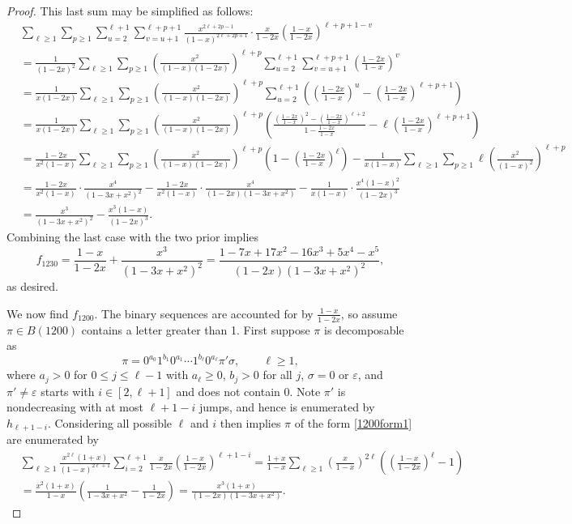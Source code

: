 \documentclass[10pt,a4paper]{amsart}
\begin{document}
\begin{proof}
This last sum may be simplified as follows:
\begin{align*}
&\sum_{\ell \geq1}\sum_{p \geq1}\sum_{u=2}^{\ell+1}\sum_{v=u+1}^{\ell+p+1}\frac{x^{2\ell+2p-1}}{(1-x)^{2\ell+2p+1}}\cdot\frac{x}{1-2x}\left(\frac{1-x}{1-2x}\right)^{\ell+p+1-v}\\
&=\frac{1}{(1-2x)^2}\sum_{\ell \geq1}\sum_{p \geq1}\left(\frac{x^2}{(1-x)(1-2x)}\right)^{\ell+p}\sum_{u=2}^{\ell+1}\sum_{v=u+1}^{\ell+p+1}\left(\frac{1-2x}{1-x}\right)^v\\
&=\frac{1}{x(1-2x)}\sum_{\ell \geq1}\sum_{p \geq1}\left(\frac{x^2}{(1-x)(1-2x)}\right)^{\ell+p}\sum_{u=2}^{\ell+1}\left(\left(\frac{1-2x}{1-x}\right)^u-\left(\frac{1-2x}{1-x}\right)^{\ell+p+1}\right)\qquad\qquad\qquad\qquad\quad\\
&=\frac{1}{x(1-2x)}\sum_{\ell \geq1}\sum_{p \geq1}\left(\frac{x^2}{(1-x)(1-2x)}\right)^{\ell+p}\left(\frac{\left(\frac{1-2x}{1-x}\right)^2-\left(\frac{1-2x}{1-x}\right)^{\ell+2}}{1-\frac{1-2x}{1-x}}-\ell\left(\frac{1-2x}{1-x}\right)^{\ell+p+1}\right)\\
&=\frac{1-2x}{x^2(1-x)}\sum_{\ell \geq1}\sum_{p \geq1}\left(\frac{x^2}{(1-x)(1-2x)}\right)^{\ell+p}\left(1-\left(\frac{1-2x}{1-x}\right)^\ell\right)-\frac{1}{x(1-x)}\sum_{\ell\geq1}\sum_{p\geq1}\ell\left(\frac{x^2}{(1-x)^2}\right)^{\ell+p}\\
&=\frac{1-2x}{x^2(1-x)}\cdot\frac{x^4}{(1-3x+x^2)^2}-\frac{1-2x}{x^2(1-x)}\cdot\frac{x^4}{(1-2x)(1-3x+x^2)}-\frac{1}{x(1-x)}\cdot\frac{x^4(1-x)^2}{(1-2x)^3}\\
&=\frac{x^3}{(1-3x+x^2)^2}-\frac{x^3(1-x)}{(1-2x)^3}.
\end{align*}
Combining the last case with the two prior implies
$$f_{1230}=\frac{1-x}{1-2x}+\frac{x^3}{(1-3x+x^2)^2}=\frac{1-7x+17x^2-16x^3+5x^4-x^5}{(1-2x)(1-3x+x^2)^2},$$
as desired.

We now find $f_{1200}$. The binary sequences are accounted for by $\frac{1-x}{1-2x}$, so assume $\pi \in B(1200)$ contains a letter greater than 1.  First suppose $\pi$ is decomposable as
\begin{equation}\label{1200form1}
\pi=0^{a_0}1^{b_1}0^{a_1}\cdots1^{b_\ell}0^{a_\ell}\pi'\sigma, \qquad \ell \geq 1,
\end{equation}
where $a_j>0$ for $0 \leq j \leq \ell-1$ with $a_\ell \geq0$, $b_j>0$ for all $j$, $\sigma=0$ or $\varepsilon$, and $\pi' \neq \varepsilon$ starts with $i \in [2,\ell+1]$ and does not contain 0. Note $\pi'$ is nondecreasing with at most $\ell+1-i$ jumps, and hence is enumerated by $h_{\ell+1-i}$. Considering all possible $\ell$ and $i$ then implies $\pi$ of the form \eqref{1200form1} are enumerated by
\begin{align*}
&\sum_{\ell \geq1}\frac{x^{2\ell}(1+x)}{(1-x)^{2\ell+1}}\sum_{i=2}^{\ell+1}\frac{x}{1-2x}\left(\frac{1-x}{1-2x}\right)^{\ell+1-i}=\frac{1+x}{1-x}\sum_{\ell \geq1}\left(\frac{x}{1-x}\right)^{2\ell}\left(\left(\frac{1-x}{1-2x}\right)^\ell-1\right)\\
&=\frac{x^2(1+x)}{1-x}\left(\frac{1}{1-3x+x^2}-\frac{1}{1-2x}\right)=\frac{x^3(1+x)}{(1-2x)(1-3x+x^2)}.
\end{align*}


\end{proof}
\end{document}
